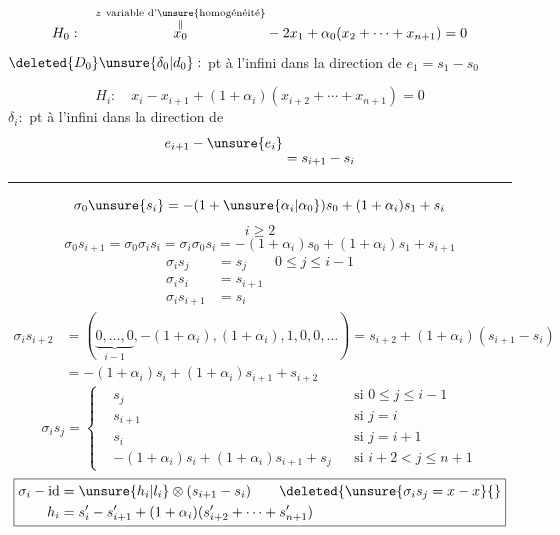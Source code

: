 \[
H_0:\quad\overset{\substack{z\ \text{variable d'\unsure{homogénéité}}\\\Vert}}{x_0}-2x_1+\alpha_0(x_2+\cdots+x_{n+1})=0
\]
$\deleted{D_0}\unsure{\delta_0|d_0}:$ pt à l'infini dans la direction de $e_1=s_1-s_0$

\[
H_i:\quad x_i-x_{i+1}+(1+\alpha_i)(x_{i+2}+\cdots+x_{n+1})=0
\]
$\delta_i:$ pt à l'infini dans la direction de
\[
\begin{aligned}
e_{i+1}-\unsure{e_i}&\\[-1ex]
&=s_{i+1}-s_i
\end{aligned}
\]
\noindent\rule{3cm}{.4pt}

\[
\sigma_0\unsure{s_i}=-(1+\unsure{\alpha_i|\alpha_0})s_0+(1+\alpha_i)s_1+s_i
\]
\[
i\geq2
\]
\[
\sigma_0s_{i+1}=\sigma_0\sigma_is_i=\sigma_i\sigma_0s_i=-(1+\alpha_i)s_0+(1+\alpha_i)s_1+s_{i+1}
\]
\[
\begin{aligned}
\sigma_is_j&=s_j\qquad 0\leq j\leq i-1\\
\sigma_is_i&=s_{i+1}\\
\sigma_is_{i+1}&=s_i
\end{aligned}
\]
\[
\begin{aligned}
\sigma_is_{i+2}&=(\underbrace{0,\ldots,0}_{i-1},-(1+\alpha_i),(1+\alpha_i),1,0,0,\ldots)=s_{i+2}+(1+\alpha_i)(s_{i+1}-s_i)\\
&=-(1+\alpha_i)s_i+(1+\alpha_i)s_{i+1}+s_{i+2}
\end{aligned}
\]
\[
\boxed{\sigma_is_j=\left\{\begin{aligned}
&s_j&&\text{si }0\leq j\leq i-1\\
&s_{i+1}&&\text{si }j=i\\
&s_i&&\text{si }j=i+1\\
&-(1+\alpha_i)s_i+(1+\alpha_i)s_{i+1}+s_j&&\text{si }i+2<j\leq n+1
\end{aligned}\right.}
\]
\[
\boxed{\begin{aligned}
\sigma_i-\mathrm{id}&=\unsure{h_i|l_i}\otimes(s_{i+1}-s_i)\qquad\deleted{\unsure{\sigma_i s_j=x-x}\{}\\
h_i&=s'_i-s'_{i+1}+(1+\alpha_i)(s'_{i+2}+\cdots+s'_{n+1})
\end{aligned}}
\]

